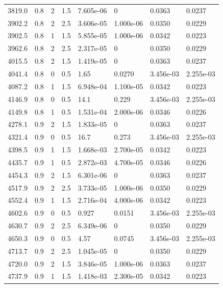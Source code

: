 \documentclass[preview]{standalone}
\begin{document}
{{{\begin{tabular}{L{1.2cm}C{1.2cm} C{0.3cm}C{0.5cm} C{1.4cm}C{1.4cm} C{1.4cm}C{1.4cm}}
  3819.0  &   0.8  & 2     & 1.5 &  7.605e-06  & 0  & 0.0363 &  0.0237   \\ 
  3902.2  &   0.8  & 2     & 2.5 &  3.606e-05  & 1.000e-06  & 0.0350 &  0.0229   \\ 
  3902.5  &   0.8  & 1     & 1.5 &  5.855e-05  & 1.000e-06  & 0.0342 &  0.0223   \\ 
  3962.6  &   0.8  & 2     & 2.5 &  2.317e-05  & 0  & 0.0350 &  0.0229   \\ 
  4015.5  &   0.8  & 2     & 1.5 &  1.419e-05  & 0  & 0.0363 &  0.0237   \\ 
  4041.4  &   0.8  & 0     & 0.5 &  1.65  & 0.0270  & 3.456e-03 &  2.255e-03   \\ 
  4087.2  &   0.8  & 1     & 1.5 &  6.948e-04  & 1.100e-05  & 0.0342 &  0.0223   \\ 
  4146.9  &   0.8  & 0     & 0.5 &  14.1  & 0.229  & 3.456e-03 &  2.255e-03   \\ 
  4149.8  &   0.8  & 1     & 0.5 &  1.531e-04  & 2.000e-06  & 0.0346 &  0.0226   \\ 
  4278.1  &   0.9  & 2     & 1.5 &  1.833e-05  & 0  & 0.0363 &  0.0237   \\ 
  4321.4  &   0.9  & 0     & 0.5 &  16.7  & 0.273  & 3.456e-03 &  2.255e-03   \\ 
  4398.5  &   0.9  & 1     & 1.5 &  1.668e-03  & 2.700e-05  & 0.0342 &  0.0223   \\ 
  4435.7  &   0.9  & 1     & 0.5 &  2.872e-03  & 4.700e-05  & 0.0346 &  0.0226   \\ 
  4454.3  &   0.9  & 2     & 1.5 &  6.301e-06  & 0  & 0.0363 &  0.0237   \\ 
  4517.9  &   0.9  & 2     & 2.5 &  3.733e-05  & 1.000e-06  & 0.0350 &  0.0229   \\ 
  4552.4  &   0.9  & 1     & 1.5 &  2.716e-04  & 4.000e-06  & 0.0342 &  0.0223   \\ 
  4602.6  &   0.9  & 0     & 0.5 &  0.927  & 0.0151  & 3.456e-03 &  2.255e-03   \\ 
  4630.7  &   0.9  & 2     & 2.5 &  6.349e-06  & 0  & 0.0350 &  0.0229   \\ 
  4650.3  &   0.9  & 0     & 0.5 &  4.57  & 0.0745  & 3.456e-03 &  2.255e-03   \\ 
  4713.7  &   0.9  & 2     & 2.5 &  1.045e-05  & 0  & 0.0350 &  0.0229   \\ 
  4720.0  &   0.9  & 2     & 1.5 &  3.846e-05  & 1.000e-06  & 0.0363 &  0.0237   \\ 
  4737.9  &   0.9  & 1     & 1.5 &  1.418e-03  & 2.300e-05  & 0.0342 &  0.0223   \\ 

\end{tabular}}}}
\end{document}
